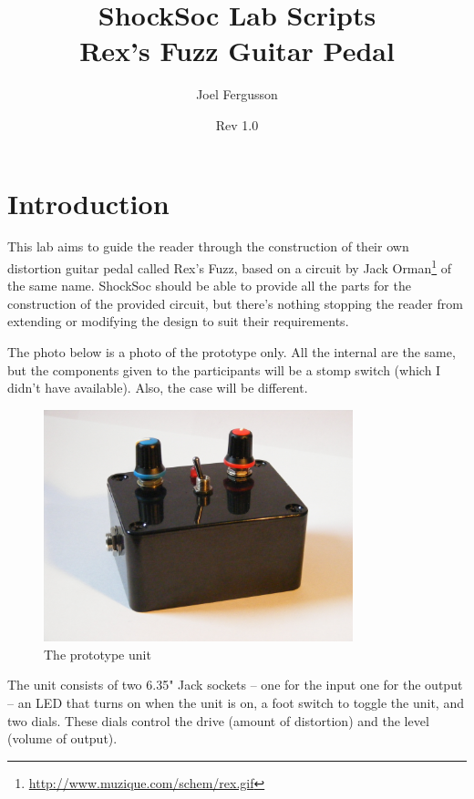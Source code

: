 \documentclass[a4paper]{article}
\title{ShockSoc Lab Scripts\\ \huge{Rex's Fuzz Guitar Pedal}}
\author{Joel Fergusson}
\date{Rev 1.0}
\begin{document}
\maketitle

\newcommand{\ohm}{$\Omega$}
\newcommand{\micro}{$\mu$}

\section{Introduction}

	This lab aims to guide the reader through the construction of their 
	own distortion guitar pedal called Rex's Fuzz, based on a circuit by 
	Jack Orman\footnote{\url{http://www.muzique.com/schem/rex.gif}} of 
	the same name. ShockSoc should be able to provide all the parts for 
	the construction of the provided circuit, but there's nothing 
	stopping the reader from extending or modifying the design to suit 
	their requirements. 
	
	The photo below is a photo of the prototype only. All the internal 
	are the same, but the components given to the participants will be
	a stomp switch (which I didn't have available). Also, 
	the case will be different. 
	
	\begin{figure}[ht]
		\centering
		\includegraphics[width=0.8\textwidth]{DSCF7302.JPG}
		\caption{The prototype unit}
		\label{fig:schematic}
	\end{figure}
	
	The unit consists of two 6.35" Jack sockets -- one for the input one 
	for the output -- an LED that turns on when the unit is on, a foot 
	switch to toggle the unit, and two dials. These dials control the 
	drive (amount of distortion) and the level (volume of output).
\end{document}
